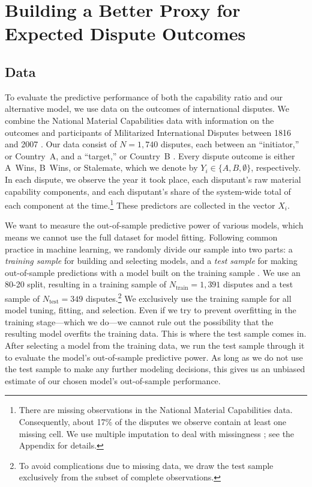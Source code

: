 \section{Building a Better Proxy for Expected Dispute Outcomes}

\subsection{Data}

To evaluate the predictive performance of both the capability ratio and our alternative model, we use data on the outcomes of international disputes.
We combine the National Material Capabilities data  with information on the outcomes and participants of Militarized International Disputes between 1816 and 2007 .
Our data consist of $N = 1{,}740$ disputes, each between an ``initiator,'' or Country~A, and a ``target,'' or Country~B .
Every dispute outcome is either A~Wins, B~Wins, or Stalemate, which we denote by $Y_i \in \{A, B, \emptyset\}$, respectively.
In each dispute, we observe the year it took place, each disputant's raw material capability components, and each disputant's share of the system-wide total of each component at the time.\footnote{
  There are missing observations in the National Material Capabilities data.
  Consequently, about 17\% of the disputes we observe contain at least one missing cell.
  We use multiple imputation to deal with missingness ; see the Appendix for details.
}
These predictors are collected in the vector $X_i$.

We want to measure the out-of-sample predictive power of various models, which means we cannot use the full dataset for model fitting.
Following common practice in machine learning, we randomly divide our sample into two parts: a \emph{training sample} for building and selecting models, and a \emph{test sample} for making out-of-sample predictions with a model built on the training sample .
We use an 80-20 split, resulting in a training sample of $N_{\text{train}} = 1{,}391$ disputes and a test sample of $N_{\text{test}} = 349$ disputes.\footnote{
  To avoid complications due to missing data, we draw the test sample exclusively from the subset of complete observations.
}
We exclusively use the training sample for all model tuning, fitting, and selection.
Even if we try to prevent overfitting in the training stage---which we do---we cannot rule out the possibility that the resulting model overfits the training data.
This is where the test sample comes in.
After selecting a model from the training data, we run the test sample through it to evaluate the model's out-of-sample predictive power.
As long as we do not use the test sample to make any further modeling decisions, this gives us an unbiased estimate of our chosen model's out-of-sample performance.

